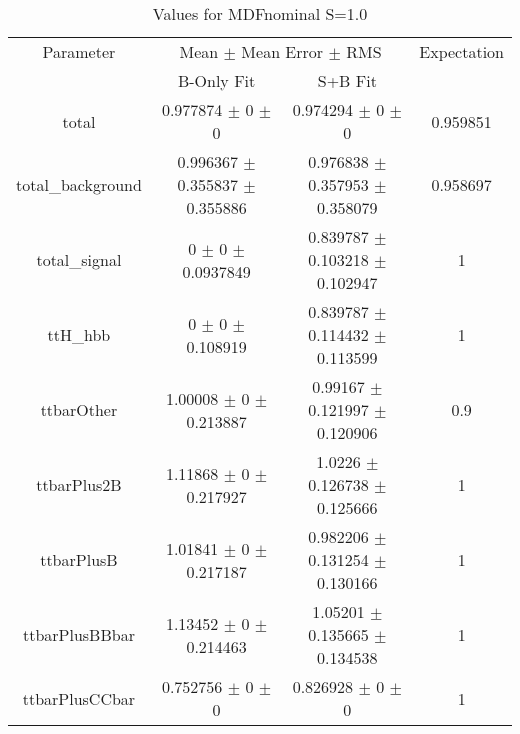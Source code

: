 \begin{table}
\centering
\caption{Values for MDFnominal S=1.0}
\begin{tabular}{cccc}
\toprule
Parameter & \multicolumn{2}{c}{Mean $\pm$ Mean Error $\pm$ RMS} & Expectation\\
 & B-Only Fit & S+B Fit & \\
\midrule
total & \num{0.977874} $\pm$ \num{0} $\pm$ \num{0} & \num{0.974294} $\pm$ \num{0} $\pm$ \num{0} & \num{0.959851}\\
total\_background & \num{0.996367} $\pm$ \num{0.355837} $\pm$ \num{0.355886} & \num{0.976838} $\pm$ \num{0.357953} $\pm$ \num{0.358079} & \num{0.958697}\\
total\_signal & \num{0} $\pm$ \num{0} $\pm$ \num{0.0937849} & \num{0.839787} $\pm$ \num{0.103218} $\pm$ \num{0.102947} & \num{1}\\
ttH\_hbb & \num{0} $\pm$ \num{0} $\pm$ \num{0.108919} & \num{0.839787} $\pm$ \num{0.114432} $\pm$ \num{0.113599} & \num{1}\\
ttbarOther & \num{1.00008} $\pm$ \num{0} $\pm$ \num{0.213887} & \num{0.99167} $\pm$ \num{0.121997} $\pm$ \num{0.120906} & \num{0.9}\\
ttbarPlus2B & \num{1.11868} $\pm$ \num{0} $\pm$ \num{0.217927} & \num{1.0226} $\pm$ \num{0.126738} $\pm$ \num{0.125666} & \num{1}\\
ttbarPlusB & \num{1.01841} $\pm$ \num{0} $\pm$ \num{0.217187} & \num{0.982206} $\pm$ \num{0.131254} $\pm$ \num{0.130166} & \num{1}\\
ttbarPlusBBbar & \num{1.13452} $\pm$ \num{0} $\pm$ \num{0.214463} & \num{1.05201} $\pm$ \num{0.135665} $\pm$ \num{0.134538} & \num{1}\\
ttbarPlusCCbar & \num{0.752756} $\pm$ \num{0} $\pm$ \num{0} & \num{0.826928} $\pm$ \num{0} $\pm$ \num{0} & \num{1}\\
\bottomrule
\end{tabular}
\end{table}